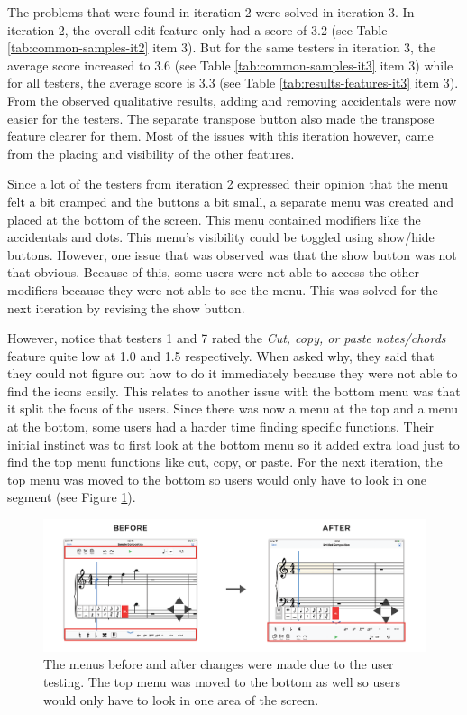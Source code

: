			The problems that were found in iteration 2 were solved in iteration 3. In iteration 2, the overall edit feature only had a score of 3.2 (see Table \ref{tab:common-samples-it2} item 3). But for the same testers in iteration 3, the average score increased to 3.6 (see Table \ref{tab:common-samples-it3} item 3) while for all testers, the average score is 3.3 (see Table \ref{tab:results-features-it3} item 3). From the observed qualitative results, adding and removing accidentals were now easier for the testers. The separate transpose button also made the transpose feature clearer for them. Most of the issues with this iteration however, came from the placing and visibility of the other features. 

			Since a lot of the testers from iteration 2 expressed their opinion that the menu felt a bit cramped and the buttons a bit small, a separate menu was created and placed at the bottom of the screen. This menu contained modifiers like the accidentals and dots. This menu's visibility could be toggled using show/hide buttons. However, one issue that was observed was that the show button was not that obvious. Because of this, some users were not able to access the other modifiers because they were not able to see the menu. This was solved for the next iteration by revising the show button. 

			However, notice that testers 1 and 7 rated the \textit{Cut, copy, or paste notes/chords} feature quite low at 1.0 and 1.5 respectively. When asked why, they said that they could not figure out how to do it immediately because they were not able to find the icons easily. This relates to another issue with the bottom menu was that it split the focus of the users. Since there was now a menu at the top and a menu at the bottom, some users had a harder time finding specific functions. Their initial instinct was to first look at the bottom menu so it added extra load just to find the top menu functions like cut, copy, or paste. For the next iteration, the top menu was moved to the bottom so users would only have to look in one segment (see Figure \ref{fig:before-after-menu}). 

			\begin{figure}[h]
				\centering
				\includegraphics[scale=0.28]{figures/before-after-menu}
			    \caption{The menus before and after changes were made due to the user testing. The top menu was moved to the bottom as well so users would only have to look in one area of the screen.}
			    \label{fig:before-after-menu}
			\end{figure}

